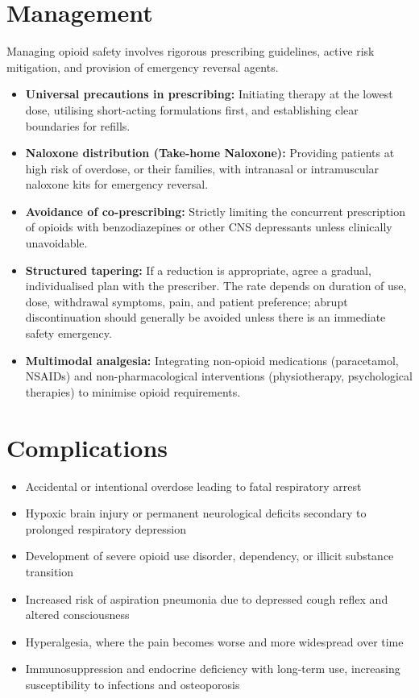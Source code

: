 \section*{Management}
Managing opioid safety involves rigorous prescribing guidelines, active risk mitigation, and provision of emergency reversal agents.
\begin{itemize}
    \item \textbf{Universal precautions in prescribing:} Initiating therapy at the lowest dose, utilising short-acting formulations first, and establishing clear boundaries for refills.
    \item \textbf{Naloxone distribution (Take-home Naloxone):} Providing patients at high risk of overdose, or their families, with intranasal or intramuscular naloxone kits for emergency reversal.
    \item \textbf{Avoidance of co-prescribing:} Strictly limiting the concurrent prescription of opioids with benzodiazepines or other CNS depressants unless clinically unavoidable.
    \item \textbf{Structured tapering:} If a reduction is appropriate, agree a gradual, individualised plan with the prescriber. The rate depends on duration of use, dose, withdrawal symptoms, pain, and patient preference; abrupt discontinuation should generally be avoided unless there is an immediate safety emergency.
    \item \textbf{Multimodal analgesia:} Integrating non-opioid medications (paracetamol, NSAIDs) and non-pharmacological interventions (physiotherapy, psychological therapies) to minimise opioid requirements.
\end{itemize}

\section*{Complications}
\begin{itemize}
    \item Accidental or intentional overdose leading to fatal respiratory arrest
    \item Hypoxic brain injury or permanent neurological deficits secondary to prolonged respiratory depression
    \item Development of severe opioid use disorder, dependency, or illicit substance transition
    \item Increased risk of aspiration pneumonia due to depressed cough reflex and altered consciousness
    \item Hyperalgesia, where the pain becomes worse and more widespread over time
    \item Immunosuppression and endocrine deficiency with long-term use, increasing susceptibility to infections and osteoporosis
\end{itemize}

